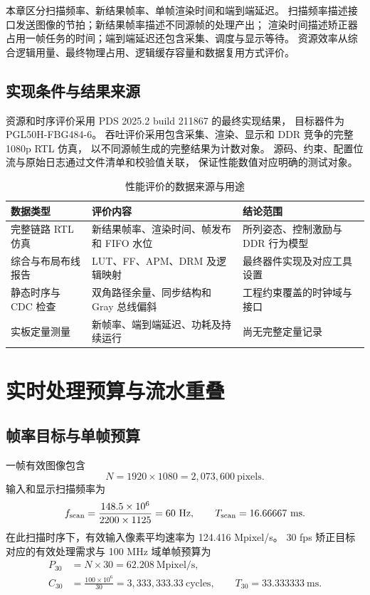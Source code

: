 本章区分扫描频率、新结果帧率、单帧渲染时间和端到端延迟。
扫描频率描述接口发送图像的节拍；新结果帧率描述不同源帧的处理产出；
渲染时间描述矫正器占用一帧任务的时间；端到端延迟还包含采集、调度与显示等待。
资源效率从综合逻辑用量、最终物理占用、逻辑缓存容量和数据复用方式评价。

\subsection{实现条件与结果来源}
资源和时序评价采用 PDS 2025.2 build 211867 的最终实现结果，
目标器件为 PGL50H-FBG484-6。
吞吐评价采用包含采集、渲染、显示和 DDR 竞争的完整 1080p RTL 仿真，
以不同源帧生成的完整结果为计数对象。
源码、约束、配置位流与原始日志通过文件清单和校验值关联，
保证性能数值对应明确的测试对象。

\begin{table}[htbp]\centering\small
\caption{性能评价的数据来源与用途}\label{tab:rt-evidence}
\begin{tabularx}{\textwidth}{>{\raggedright\arraybackslash}p{3.2cm}YY}
\toprule
数据类型 & 评价内容 & 结论范围 \\
\midrule
完整链路 RTL 仿真 & 新结果帧率、渲染时间、帧发布和 FIFO 水位 & 所列姿态、控制激励与 DDR 行为模型 \\
综合与布局布线报告 & LUT、FF、APM、DRM 及逻辑映射 & 最终器件实现及对应工具设置 \\
静态时序与 CDC 检查 & 双角路径余量、同步结构和 Gray 总线偏斜 & 工程约束覆盖的时钟域与接口 \\
实板定量测量 & 新帧率、端到端延迟、功耗及持续运行 & 尚无完整定量记录 \\
\bottomrule
\end{tabularx}
\end{table}


\section{实时处理预算与流水重叠}
\subsection{帧率目标与单帧预算}
一帧有效图像包含
\begin{equation}
N=1920\times1080=2,073,600\ \text{pixels}.
\end{equation}
输入和显示扫描频率为
\begin{equation}
f_{\rm scan}=\frac{148.5\times10^6}{2200\times1125}
=60\ \text{Hz},\qquad T_{\rm scan}=16.66667\ \text{ms}.
\end{equation}
在此扫描时序下，有效输入像素平均速率为 124.416 Mpixel/s。
30 fps 矫正目标对应的有效处理需求与 100 MHz 域单帧预算为
\begin{align}
P_{30}&=N\times30=62.208\ \text{Mpixel/s},\\
C_{30}&=\frac{100\times10^6}{30}=3,333,333.33\ \text{cycles},\qquad
T_{30}=33.333333\ \text{ms}.
\end{align}

